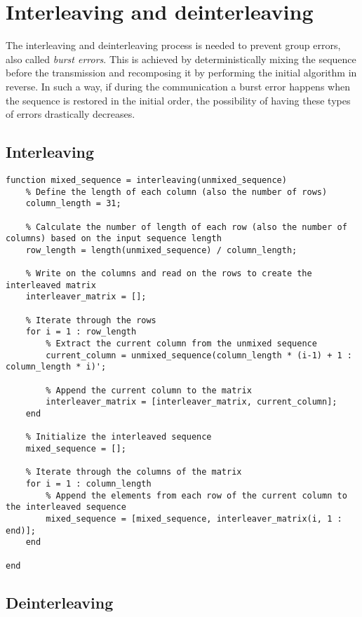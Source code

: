 \vspace{40px} \section{Interleaving and deinterleaving}
The interleaving and deinterleaving process is needed to prevent group errors, also called \textsl{burst errors}. This is achieved by deterministically mixing the sequence before the transmission and recomposing it by performing the initial algorithm in reverse. In such a way, if during the communication a burst error happens when the sequence is restored in the initial order, the possibility of having these types of errors drastically decreases.


\subsection{Interleaving}


\begin{lstlisting}
function mixed_sequence = interleaving(unmixed_sequence)
    % Define the length of each column (also the number of rows)
    column_length = 31;

    % Calculate the number of length of each row (also the number of columns) based on the input sequence length
    row_length = length(unmixed_sequence) / column_length;

    % Write on the columns and read on the rows to create the interleaved matrix
    interleaver_matrix = [];

    % Iterate through the rows
    for i = 1 : row_length
        % Extract the current column from the unmixed sequence
        current_column = unmixed_sequence(column_length * (i-1) + 1 : column_length * i)';
        
        % Append the current column to the matrix
        interleaver_matrix = [interleaver_matrix, current_column];
    end
    
    % Initialize the interleaved sequence
    mixed_sequence = [];

    % Iterate through the columns of the matrix
    for i = 1 : column_length
        % Append the elements from each row of the current column to the interleaved sequence
        mixed_sequence = [mixed_sequence, interleaver_matrix(i, 1 : end)];
    end

end
\end{lstlisting}

\subsection{Deinterleaving}
